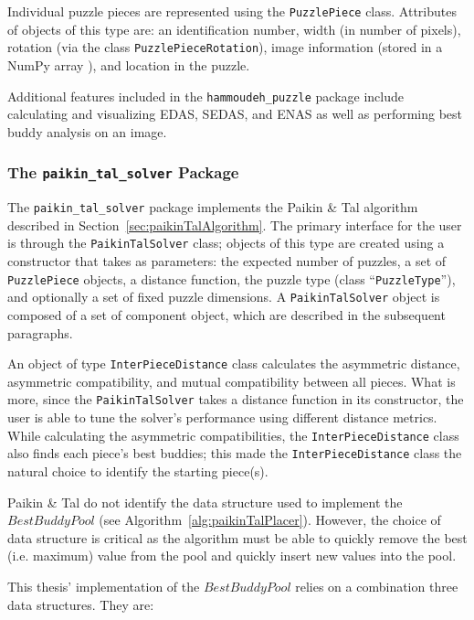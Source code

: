 \documentclass{report}
\newcommand{\hammoudehPuzzlePackage}{\texttt{hammoudeh\_puzzle} }
\newcommand{\paikinTalPackage}{\texttt{paikin\_tal\_solver} }
\begin{document}
Individual puzzle pieces are represented using the \texttt{PuzzlePiece} class.  Attributes of objects of this type are: an identification number, width (in number of pixels), rotation (via the class \texttt{PuzzlePieceRotation}), image information (stored in a NumPy array \cite{walt2011}), and location in the puzzle.

Additional features included in the \hammoudehPuzzlePackage package include calculating and visualizing EDAS, SEDAS, and ENAS as well as performing best buddy analysis on an image.

\subsubsection{The \paikinTalPackage Package}\label{sec:paikinTalSolverPackage}

The \paikinTalPackage package implements the Paikin \& Tal algorithm described in Section~\ref{sec:paikinTalAlgorithm}.  The primary interface for the user is through the \texttt{PaikinTalSolver} class; objects of this type are created using a constructor that takes as parameters: the expected number of puzzles, a set of \texttt{PuzzlePiece} objects, a distance function, the puzzle type (class ``\texttt{PuzzleType}''), and optionally a set of fixed puzzle dimensions.  A \texttt{PaikinTalSolver} object is composed of a set of component object, which are described in the subsequent paragraphs.

An object of type \texttt{InterPieceDistance} class calculates the asymmetric distance, asymmetric compatibility, and mutual compatibility between all pieces.  What is more, since the \texttt{PaikinTalSolver} takes a distance function in its constructor, the user is able to tune the solver's performance using different distance metrics.  While calculating the asymmetric compatibilities, the \texttt{InterPieceDistance} class also finds each piece's best buddies; this made the \texttt{InterPieceDistance} class the natural choice to identify the starting piece(s).

Paikin \& Tal do not identify the data structure used to implement the $BestBuddyPool$ (see Algorithm~\ref{alg:paikinTalPlacer}). However, the choice of data structure is critical as the algorithm must be able to quickly remove the best (i.e. maximum) value from the pool and quickly insert new values into the pool.

This thesis' implementation of the $BestBuddyPool$ relies on a combination three data structures.  They are:
\end{document}

